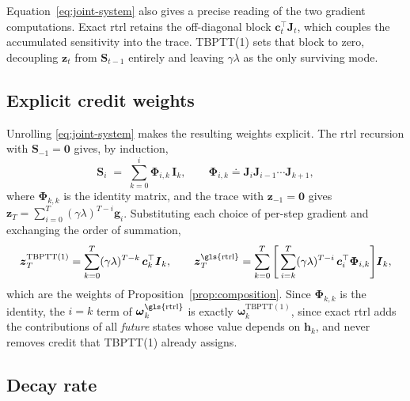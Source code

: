 \documentclass{article}
\begin{document}
Equation~\eqref{eq:joint-system} also gives a precise reading of the two gradient
computations. Exact \gls{rtrl} retains the off-diagonal block
$\boldsymbol{c}_t^\top \boldsymbol{J}_t$, which couples the accumulated sensitivity into
the trace. TBPTT(1) sets that block to zero, decoupling $\boldsymbol{z}_t$ from
$\boldsymbol{S}_{t-1}$ entirely and leaving $\gamma\lambda$ as the only surviving
mode.

\subsection{Explicit credit weights}

Unrolling \eqref{eq:joint-system} makes the resulting weights explicit. The
\gls{rtrl} recursion with $\boldsymbol{S}_{-1} = \boldsymbol{0}$ gives, by induction,
\begin{equation}
    \boldsymbol{S}_i \;=\; \sum_{k=0}^{i} \boldsymbol{\Phi}_{i,k}\, \boldsymbol{I}_k,
    \qquad
    \boldsymbol{\Phi}_{i,k} \doteq \boldsymbol{J}_i \boldsymbol{J}_{i-1}\cdots \boldsymbol{J}_{k+1},
    \label{eq:unroll-S}
\end{equation}
where $\boldsymbol{\Phi}_{k,k}$ is the identity matrix, and the trace with
$\boldsymbol{z}_{-1} = \boldsymbol{0}$ gives
$\boldsymbol{z}_T = \sum_{i=0}^{T} (\gamma\lambda)^{T-i} \boldsymbol{g}_i$. Substituting
each choice of per-step gradient and exchanging the order of summation,
\begin{equation}
    \boldsymbol{z}_T^{\mathrm{TBPTT(1)}} = \sum_{k=0}^{T} (\gamma\lambda)^{T-k}\,
    \boldsymbol{c}_k^\top \boldsymbol{I}_k,
    \qquad
    \boldsymbol{z}_T^{\mathrm{\gls{rtrl}}} = \sum_{k=0}^{T}
    \Bigg[\sum_{i=k}^{T} (\gamma\lambda)^{T-i}\, \boldsymbol{c}_i^\top
    \boldsymbol{\Phi}_{i,k}\Bigg] \boldsymbol{I}_k ,
\end{equation}
which are the weights of Proposition~\ref{prop:composition}. Since
$\boldsymbol{\Phi}_{k,k}$ is the identity, the $i=k$ term of
$\boldsymbol{\omega}_k^{\mathrm{\gls{rtrl}}}$ is exactly
$\boldsymbol{\omega}_k^{\mathrm{TBPTT(1)}}$, since exact \gls{rtrl} adds the contributions
of all \emph{future} states whose value depends on $\boldsymbol{h}_k$, and never
removes credit that TBPTT(1) already assigns.

\subsection{Decay rate}
\end{document}
